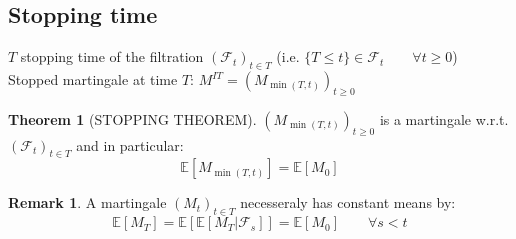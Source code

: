 \documentclass[10pt,a4paper]{article}
\theoremstyle{definition}
\newtheorem{teo}{Theorem}[section]
\newtheorem*{rem}{Remark}
\begin{document}
\subsection{Stopping time}
$T$ stopping time of the filtration $(\mathcal{F}_t)_{t\in T}$ (i.e. $\{T\leq t\}\in\mathcal{F}_t \qquad\forall t\geq0$)\\
Stopped martingale at time $T$: $M^{IT}=(M_{\min{(T,t)}})_{t\geq0}$
\begin{teo}[STOPPING THEOREM]
	$(M_{\min{(T,t)}})_{t\geq0}$ is a martingale w.r.t. $(\mathcal{F}_t)_{t\in T}$ and in particular:
	\begin{equation}
		\mathbb{E}[M_{\min{(T,t)}}]=\mathbb{E}[M_{0}]
	\end{equation}
\end{teo}
\begin{rem}
	A martingale $(M_t)_{t\in T}$ necesseraly has constant means by:
	\begin{equation*}
		\mathbb{E}[M_{T}]=\mathbb{E}[\mathbb{E}[M_{T}|\mathcal{F}_s]]=\mathbb{E}[M_{0}] \qquad \forall s<t
	\end{equation*} 
\end{rem}
\end{document}
